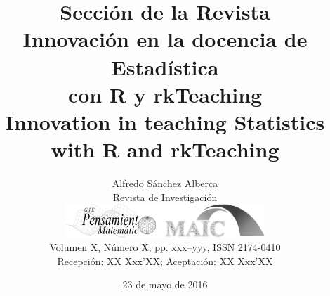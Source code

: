 \documentclass[a4paper,10pt,twoside]{article}
\begin{document}
\renewcommand{\tablename}{Tabla} 

\title{\vspace{-8mm}Sección de la Revista\\\vspace{4mm}
Innovación en la docencia de Estadística\\ con R y rkTeaching\\\vspace{4mm}
Innovation in teaching Statistics\\ with R and rkTeaching\vspace{-3mm}}  %
\author{\href{mailto:asalber@ceu.es}{Alfredo Sánchez Alberca}\\ \vspace{2mm} %
\scriptsize Revista de Investigación\\
\small
\href{http://www2.caminos.upm.es/Departamentos/matematicas/revistapm/}{\includegraphics[width=75.2mm]{logosrev.png}}\\
\scriptsize Volumen X, Número X, pp. xxx--yyy, ISSN 2174-0410\vspace{-2mm}\\ 
\scriptsize Recepción: XX Xxx'XX; Aceptación: XX Xxx'XX} %
\date{23 de mayo de 2016}
\maketitle
\end{document}

